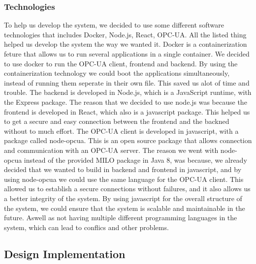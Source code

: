 \subsubsection{Technologies}
To help us develop the system, we decided to use some different software technologies that includes Docker, Node.js, React, OPC-UA. All the listed thing helped us develop the system the way we wanted it.
Docker is a containerization feture that allows us to run several applications in a single container. We decided to use docker to run the OPC-UA client, frontend and backend. By using the containerization technology we could boot the applications simultaneously, instead of running them seperate in their own file. This saved us alot of time and trouble.\newline\newline
The backend is developed in Node.js, which is a JavaScript runtime, with the Express package. The reason that we decided to use node.js was because the frontend is developed in React, which also is a javascript package. This helped us to get a secure and easy connection between the frontend and the backned without to much effort. The OPC-UA client is developed in javascript, with a package called node-opcua. This is an open source package that allows connection and communication with an OPC-UA server.\newline\newline
The reason we went with node-opcua instead of the provided MILO package in Java 8, was because, we already decided that we wanted to build in backend and frontend in javascript, and by using node-opcua we could use the same language for the OPC-UA client. This allowed us to establish a secure connections without failures, and it also allows us a better integrity of the system.
By using javascript for the overall structure of the system, we could ensure that the system is scalable and maintainable in the future. Aswell as not having multiple different programming languages in the system, which can lead to conflics and other problems. \newline

\subsection{Design Implementation}

